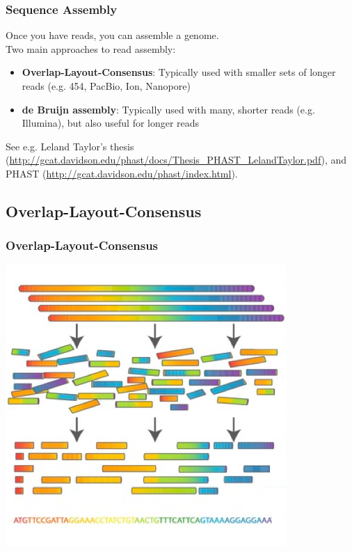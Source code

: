 

\begin{frame}
  \frametitle{Sequence Assembly}
  Once you have reads, you can assemble a genome.\\[0.25cm]
  Two main approaches to read assembly:
  \begin{itemize}
    \item \textbf{Overlap-Layout-Consensus}: Typically used with smaller sets of longer reads (e.g. 454, PacBio, Ion, Nanopore)
    \item \textbf{de Bruijn assembly}: Typically used with many, shorter reads (e.g. Illumina), but also useful for longer reads
  \end{itemize}
  See e.g. Leland Taylor's thesis (\href{http://gcat.davidson.edu/phast/docs/Thesis_PHAST_LelandTaylor.pdf}{http://gcat.davidson.edu/phast/docs/Thesis\_PHAST\_LelandTaylor.pdf}), and PHAST (\href{http://gcat.davidson.edu/phast/index.html}{http://gcat.davidson.edu/phast/index.html}).
\end{frame}

\subsection{Overlap-Layout-Consensus}

\begin{frame}
  \frametitle{Overlap-Layout-Consensus}
  \begin{center}
    \includegraphics[height=0.8\textheight]{images/overlap-layout-consensus}
  \end{center}  
\end{frame}

